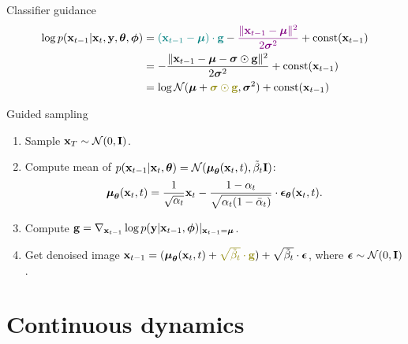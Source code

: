 \documentclass{beamer}
\begin{document}
\begin{frame}{Classifier guidance}
	\vspace{-0.5cm}
	\begin{align*}
		\log p(\bx_{t - 1} | \bx_t, \by, \btheta , \bphi) &= {\color{teal}(\bx_{t-1} - \bmu) \cdot \mathbf{g}} - {\color{violet}\frac{\|\bx_{t - 1} - \bmu\|^2}{2 \bsigma^2}} + \text{const}(\bx_{t-1}) \\
		& = - \frac{\|\bx_{t - 1} - \bmu - \bsigma \odot \mathbf{g}\|^2}{2 \bsigma^2} + \text{const}(\bx_{t-1}) \\
		& = \log \cN( \bmu + {\color{olive}\bsigma \odot \mathbf{g}}, \bsigma^2) + \text{const}(\bx_{t-1})
	\end{align*}
	\vspace{-0.5cm}
	\begin{block}{Guided sampling}
		\begin{enumerate}
			\item Sample $\mathbf{x}_T \sim \mathcal{N}(0, \mathbf{I})$.
			\item Compute mean of $p(\mathbf{x}_{t-1} | \mathbf{x}_t, \boldsymbol{\theta}) = \mathcal{N}(\boldsymbol{\mu}_{\boldsymbol{\theta}}(\mathbf{x}_t, t), \tilde{\beta}_t \mathbf{I})$:
			\[
				\boldsymbol{\mu}_{\boldsymbol{\theta}}(\mathbf{x}_t, t) = \frac{1}{\sqrt{\alpha_t}} \mathbf{x}_t - \frac{1 - \alpha_t}{\sqrt{\alpha_t (1 - \bar{\alpha}_t)}} \cdot \boldsymbol{\epsilon}_{\boldsymbol{\theta}}(\mathbf{x}_t, t).
			\]
			\vspace{-0.3cm}
			\item Compute $\mathbf{g} =  \nabla_{\mathbf{x}_{t-1}} \log p(\mathbf{y} | \mathbf{x}_{t-1}, \boldsymbol{\phi}) |_{\mathbf{x}_{t-1} = \boldsymbol{\mu}}$.
			\item Get denoised image $\bx_{t - 1} = (\bmu_{\btheta}(\bx_t, t) +  {\color{olive} \sqrt{\tilde{\beta}_t} \cdot \mathbf{g}})+ \sqrt{\tilde{\beta}_t} \cdot \bepsilon$, where $\boldsymbol{\epsilon} \sim \mathcal{N}(0, \mathbf{I})$.
		\end{enumerate}
	\end{block}
\end{frame}
\section{Continuous dynamics}
\end{document}
